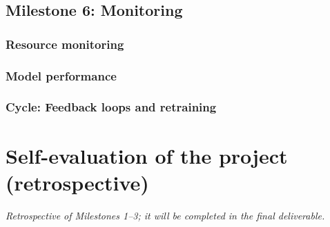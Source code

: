 \documentclass[11pt]{article}
\begin{document}
\subsection{Milestone 6: Monitoring}

\subsubsection{Resource monitoring}

\subsubsection{Model performance}

\subsubsection{Cycle: Feedback loops and retraining}

\section{Self-evaluation of the project (retrospective)}
\textit{Retrospective of Milestones 1--3; it will be completed in the final deliverable.}
\end{document}

